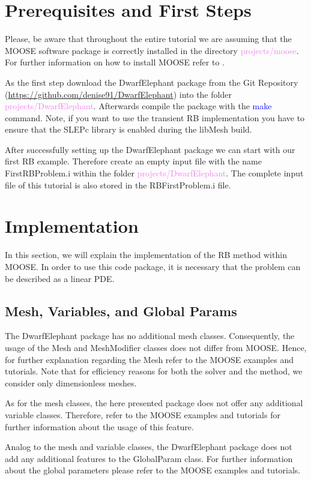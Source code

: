 \documentclass[11pt, a4paper, DIV=14]{scrartcl}
\begin{document}
\section{Prerequisites and First Steps}
Please, be aware that throughout the entire tutorial we are assuming that the MOOSE software package is correctly installed in the directory \textcolor{violet}{projects/moose}. For further information on how to install MOOSE refer to \cite{moose-web-page}.

 As the first step download the DwarfElephant package from the Git Repository (\url{https://github.com/denise91/DwarfElephant}) into the folder \textcolor{violet}{projects/DwarfElephant}. Afterwards compile the package with the \textcolor{blue}{make} command. Note, if you want to use the transient RB implementation you have to ensure that the SLEPc library \cite{slepc} is enabled during the libMesh build.

After successfully setting up the DwarfElephant package we can start with our first RB example. Therefore create an empty input file with the name FirstRBProblem.i within the folder \textcolor{violet}{projects/DwarfElephant}. The complete input file of this tutorial is also stored in the RBFirstProblem.i file.

\section{Implementation} \label{Implementation}
In this section, we will explain the implementation of the RB method within MOOSE.  In order to use this code package, it is necessary that the problem can be described as a linear PDE.

\subsection{Mesh, Variables, and Global Params}
The DwarfElephant package has no additional mesh classes. Consequently, the usage of the Mesh and MeshModifier classes does not differ from MOOSE. Hence, for further explanation regarding the Mesh refer to the MOOSE examples and tutorials. Note that for efficiency reasons for both the solver and the method, we consider only dimensionless meshes.

As for the mesh classes, the here presented package does not offer any additional variable classes. Therefore, refer to the MOOSE examples and tutorials for further information about the usage of this feature.

Analog to the mesh and variable classes, the DwarfElephant package does not add any additional features to the GlobalParam class. For further information about the global parameters please refer to the MOOSE examples and tutorials.
\end{document}
